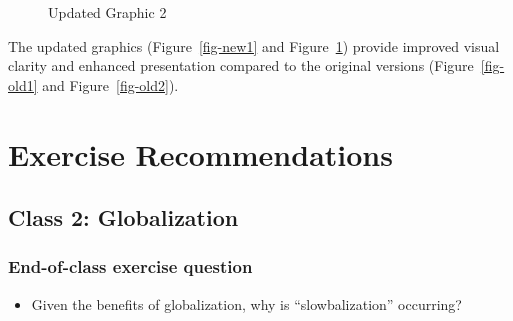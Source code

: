 \documentclass[
  11pt,
]{article}
\providecommand{\tightlist}{%
  \setlength{\itemsep}{0pt}\setlength{\parskip}{0pt}}
\begin{document}
\begin{figure}[H]


\caption{\label{fig-new2}Updated Graphic 2}

\end{figure}%

The updated graphics (Figure~\ref{fig-new1} and Figure~\ref{fig-new2})
provide improved visual clarity and enhanced presentation compared to
the original versions (Figure~\ref{fig-old1} and Figure~\ref{fig-old2}).

\section{Exercise Recommendations}\label{exercise-recommendations}

\subsection{Class 2: Globalization}\label{class-2-globalization}

\subsubsection{End-of-class exercise
question}\label{end-of-class-exercise-question}

\begin{itemize}
\tightlist
\item
  Given the benefits of globalization, why is ``slowbalization''
  occurring?
\end{itemize}
\end{document}
